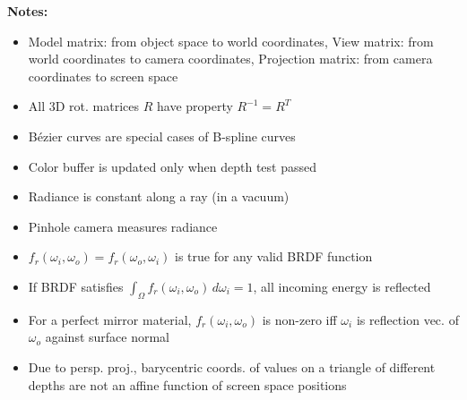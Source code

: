 \documentclass[a4paper,9pt]{article}
\begin{document}
\textbf{Notes:}
\begin{itemize}
  \item Model matrix: from object space to world coordinates, View matrix: from world coordinates to camera coordinates, Projection matrix: from camera coordinates to screen space
  \item All 3D rot. matrices $R$ have property $R^{-1} = R^T$
  \item B\'ezier curves are special cases of B-spline curves
  \item Color buffer is updated only when depth test passed
  \item Radiance is constant along a ray (in a vacuum)
  \item Pinhole camera measures radiance
  \item $f_r(\omega_i, \omega_o) = f_r(\omega_o, \omega_i)$ is true for any valid BRDF function
  \item If BRDF satisfies $\int_{\Omega} f_r(\omega_i, \omega_o) \, d\omega_i = 1$, all incoming energy is reflected
  \item For a perfect mirror material, $f_r(\omega_i, \omega_o)$ is non-zero iff $\omega_i$ is reflection vec. of $\omega_o$ against surface normal
  \item Due to persp. proj., barycentric coords. of values on a triangle of different depths are not an affine function of screen space positions
\end{itemize}
\end{document}
